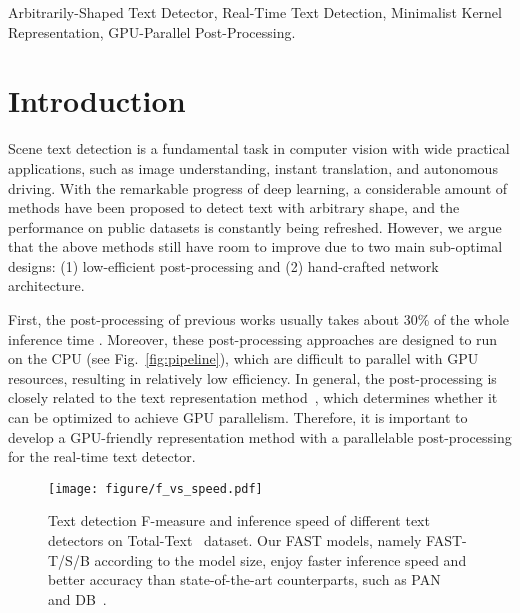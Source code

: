 \documentclass[lettersize,journal]{IEEEtran}
\begin{document}
\begin{IEEEkeywords}
Arbitrarily-Shaped Text Detector, Real-Time Text Detection, Minimalist Kernel Representation, GPU-Parallel Post-Processing.
\end{IEEEkeywords}

\section{Introduction}

Scene text detection is a fundamental task in computer vision with wide practical applications, such as image understanding, instant translation, and autonomous driving.
With the remarkable progress of deep learning, a considerable amount of methods \cite{liao2020real,long2018textsnake,wang2019shape,wang2019efficient,ye2020textfusenet,zhu2021fourier} have been proposed to detect text with arbitrary shape, and the performance on public datasets is constantly being refreshed.
However, we argue that the above methods still have room to improve due to two main sub-optimal designs:
(1) low-efficient post-processing and 
(2) hand-crafted network architecture.


First, the post-processing of previous works usually takes about 30\% of the whole inference time \cite{liao2020real,wang2019shape,wang2019efficient}.
Moreover, these post-processing approaches are designed to run on the CPU (see Fig.~\ref{fig:pipeline}), which are difficult to parallel with GPU resources, resulting in relatively low efficiency.
In general, the post-processing is closely related to the text representation method~\cite{liao2020real,liu2020abcnet,wang2019shape,wang2019efficient,long2018textsnake}, which determines whether it can be optimized to achieve GPU parallelism.
Therefore, it is important to develop a GPU-friendly representation method with a parallelable post-processing for the real-time text detector.

\begin{figure}[!t]
    \centering
    \texttt{[image: figure/f\_vs\_speed.pdf]}
    \caption{
    Text detection F-measure and inference speed of different text detectors on 
    Total-Text~\cite{ch2017total} dataset.
    Our FAST models, namely FAST-T/S/B according to the model size, enjoy faster inference speed and better accuracy than state-of-the-art counterparts, such as PAN~\cite{wang2019efficient} and DB~\cite{liao2020real}.
    }
    \label{fig:f_vs_speed}
\end{figure}
\end{document}
